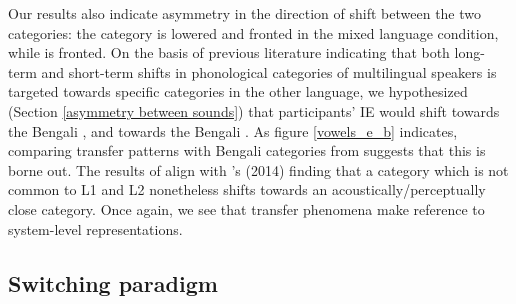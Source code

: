 \documentclass[12 pt]{article}
\newcommand{\nt}[1]{\textipa{[#1]}} %
\begin{document}
Our results also indicate asymmetry in the direction of shift between the two categories: the category \nt{2} is lowered and fronted in the mixed language condition, while \nt{\ae} is fronted. On the basis of previous literature indicating that both long-term and short-term shifts in phonological categories of multilingual speakers is targeted towards specific categories in the other language, we hypothesized (Section \ref{asymmetry between sounds}) that participants' IE \nt{\ae} would shift towards the Bengali \nt{\ae}, and \nt{2} towards the Bengali \nt{a:}. As figure \ref{vowels_e_b} indicates, comparing transfer patterns with Bengali categories from \cite{shruticorpus} suggests that this is borne out. The results of \nt{2} align with \citeauthor[][]{simonet2014phonetic}'s (2014) finding that a category which is not common to L1 and L2 nonetheless shifts towards an acoustically/perceptually close category. Once again, we see that transfer phenomena make reference to system-level representations. 


\subsection{Switching paradigm}
\end{document}
